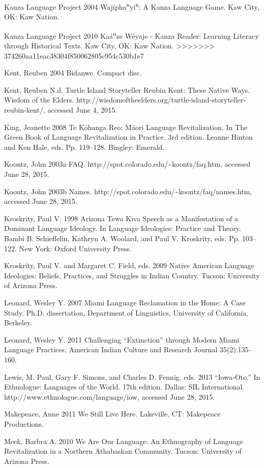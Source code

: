 \documentclass[output=paper]{LSP/langsci}
\begin{document}
\begin{reflist}
Kanza Language Project 2004 Waj\'ipha\textsuperscript{n}yi\textsuperscript{n}: A Kanza Language Game. Kaw City, OK: Kaw Nation.

Kanza Language Project 2010 Ka\'a\textsuperscript{n}ze W\'eyaje - Kanza Reader: Learning Literacy through Historical Texts. Kaw City, OK: Kaw Nation.
>>>>>>> 374260aa11eac38304f850062805c954c530b1e7

Kent, Reuben 2004 Bidanwe. Compact disc.

Kent, Reuben N.d. Turtle Island Storyteller Reubin Kent: These Native Ways. Wisdom of the Elders. http://wisdomoftheelders.org/turtle-island-storyteller-reubin-kent/, accessed June 4, 2015.

King, Jeanette 2008 Te K\=ohanga Reo: M\=aori Language Revitalization. In The Green Book of Language Revitalization in Practice. 3rd edition. Leanne Hinton and Ken Hale, eds. Pp. 119--128. Bingley: Emerald.

Koontz, John 2003a FAQ. http://spot.colorado.edu/\textasciitilde koontz/faq.htm, accessed June 28, 2015.

Koontz, John 2003b Names. http://spot.colorado.edu/\textasciitilde koontz/faq/names.htm, accessed June 28, 2015.

Kroskrity, Paul V. 1998 Arizona Tewa Kiva Speech as a Manifestation of a Dominant Language Ideology. In Language Ideologies: Practice and Theory. Bambi B. Schieffelin, Kathryn A. Woolard, and Paul V. Kroskrity, eds. Pp. 103--122. New York: Oxford University Press.

Kroskrity, Paul V. and Margaret C. Field, eds. 2009 Native American Language Ideologies: Beliefs, Practices, and Struggles in Indian Country. Tucson: University of Arizona Press.

Leonard, Wesley Y. 2007 Miami Language Reclamation in the Home: A Case Study. Ph.D. dissertation, Department of Linguistics, University of California, Berkeley.

Leonard, Wesley Y. 2011 Challenging ``Extinction'' through Modern Miami Language Practices. American Indian Culture and Research Journal 35(2):135--160.

Lewis, M. Paul, Gary F. Simons, and Charles D. Fennig. eds. 2013 ``Iowa-Oto.'' In Ethnologue: Languages of the World. 17th edition. Dallas: SIL International. http://www.ethnologue.com/language/iow, accessed June 28, 2015.

Makepeace, Anne 2011 We Still Live Here. Lakeville, CT: Makepeace Productions.

Meek, Barbra A. 2010 We Are Our Language: An Ethnography of Language Revitalization in a Northern Athabaskan Community. Tucson: University of Arizona Press.


\end{reflist}
\end{document}

